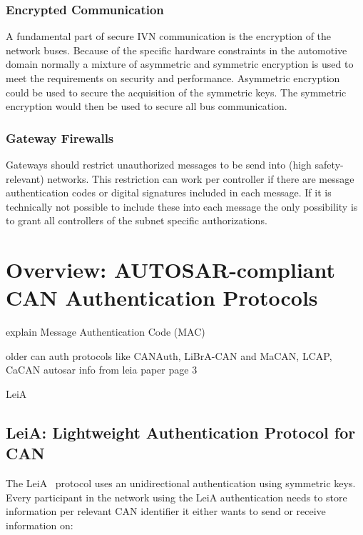 \subsubsection{Encrypted Communication}

A fundamental part of secure IVN communication is the encryption of the network
buses. Because of the specific hardware constraints in the automotive domain normally a mixture of asymmetric and symmetric encryption is used to meet the requirements on security and performance. Asymmetric encryption could be used to secure the acquisition of the symmetric keys. The symmetric encryption would then be used to secure all bus communication.

\subsubsection{Gateway Firewalls}

Gateways should restrict unauthorized messages to be send into (high safety-relevant) networks. This restriction can work per controller if there are message authentication codes or digital signatures included in each message. If it is technically not possible to include these into each message the only possibility is to grant all controllers of the subnet specific authorizations.


\section{Overview: AUTOSAR-compliant CAN Authentication Protocols} 

explain Message Authentication Code (MAC)

older can auth protocols like CANAuth, LiBrA-CAN
and MaCAN, LCAP, CaCAN
autosar info from leia paper page 3

LeiA~\cite{Radu2016}

\subsection{LeiA: Lightweight Authentication Protocol for CAN}
\label{subsec:leia}

The LeiA~\cite{Radu2016} protocol uses an unidirectional authentication using symmetric keys. Every participant in the network using the LeiA authentication needs to store information per relevant CAN identifier it either wants to send or receive information on:

